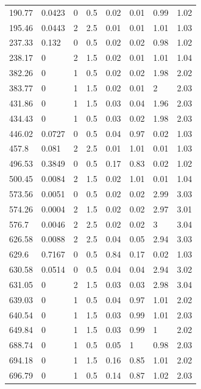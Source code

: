 \begin{longtable}[!h] {p{} p{} p{} p{} p{} p{} p{} p{}}
    190.77  &   0.0423  & 	0   & 	0.5  &	0.02 &	0.01 &	0.99 &	1.02\\
    195.46  &	0.0443  &	2   &	2.5  &	0.01 &	0.01 &	1.01 &	1.03\\
    237.33  &	0.132   &	0   &	0.5  &	0.02 &	0.02 &  0.98 &	1.02\\
    238.17  &	0       &	2   &	1.5	 &  0.02 &	0.01 &	1.01 &	1.04\\
    382.26  & 	0       &	1   &	0.5	 &  0.02 &	0.02 &	1.98 &	2.02\\
    383.77  &	0       &	1   &	1.5  &	0.02 &	0.01 &	2    &	2.03\\
    431.86  &	0       &	1   &	1.5  &	0.03 &	0.04 &	1.96 &	2.03\\
    434.43  &	0       &	1   &	0.5  &	0.03 &	0.02 &	1.98 &	2.03\\
    446.02  &	0.0727  &	0   &	0.5	 &  0.04 &	0.97 &	0.02 &	1.03\\
    457.8   &	0.081   &	2   &	2.5	 &  0.01 &	1.01 &	0.01 &	1.03\\
    496.53  &	0.3849  &	0   &	0.5  &	0.17 &	0.83 &	0.02 &	1.02\\
    500.45  &	0.0084  &	2   &	1.5  &	0.02 &	1.01 &	0.01 &	1.04\\
    573.56  &   0.0051  &	0   &	0.5  &	0.02 &	0.02 &	2.99 &	3.03\\
    574.26  &   0.0004  &	2   &	1.5	 &  0.02 &  0.02 &	2.97 &	3.01\\
    576.7   &	0.0046  &	2   &	2.5  &	0.02 &	0.02 &	3    &	3.04\\
    626.58  &	0.0088  &	2   &	2.5  &	0.04 &	0.05 &	2.94 &	3.03\\
    629.6   &	0.7167  &	0	&   0.5  &	0.84 &	0.17 &	0.02 &	1.03\\
    630.58  &	0.0514  &	0   &	0.5	 &  0.04 &  0.04 &  2.94 &	3.02\\
    631.05  &	0       &	2   &	1.5  &	0.03 &	0.03 &	2.98 &	3.04\\
    639.03  &   0       &	1   &	0.5	 &  0.04 &	0.97 &	1.01 &	2.02\\
    640.54  &   0       &	1   &	1.5	 &  0.03 &	0.99 &	1.01 &	2.03\\
    649.84  &	0       &	1   &	1.5	 & 	0.03 &	0.99 &	1    &	2.02\\
    688.74  &	0       &	1   &	0.5	 & 	0.05 &	1    &	0.98 &	2.03\\
    694.18  &	0       &	1   &	1.5	 & 	0.16 &	0.85 &	1.01 &	2.02\\
    696.79  &	0       &	1   &	0.5	 & 	0.14 &	0.87 &	1.02 &	2.03\\

\end{longtable}
